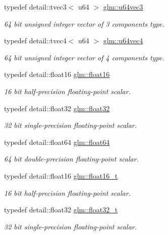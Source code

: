 \begin{DoxyCompactItemize}
typedef detail\-::tvec3$<$ u64 $>$ \hyperlink{group__gtc__type__precision_gaf3e98e85d5dd32134bf6235db89c9629}{glm\-::u64vec3}
\begin{DoxyCompactList}\small\item\em 64 bit unsigned integer vector of 3 components type. \end{DoxyCompactList}\item 
typedef detail\-::tvec4$<$ u64 $>$ \hyperlink{group__gtc__type__precision_ga550e091ec7bcd4aff560a8f5c5ff539f}{glm\-::u64vec4}
\begin{DoxyCompactList}\small\item\em 64 bit unsigned integer vector of 4 components type. \end{DoxyCompactList}\item 
typedef detail\-::float16 \hyperlink{group__gtc__type__precision_ga50c577688ec4cbdb3dfafb8e8155c82f}{glm\-::float16}
\begin{DoxyCompactList}\small\item\em 16 bit half-\/precision floating-\/point scalar. \end{DoxyCompactList}\item 
typedef detail\-::float32 \hyperlink{group__gtc__type__precision_ga814f2f65354b6588b067cc5c67a6b340}{glm\-::float32}
\begin{DoxyCompactList}\small\item\em 32 bit single-\/precision floating-\/point scalar. \end{DoxyCompactList}\item 
typedef detail\-::float64 \hyperlink{group__gtc__type__precision_gab721f828b41f46b20cf4883b50733d3b}{glm\-::float64}
\begin{DoxyCompactList}\small\item\em 64 bit double-\/precision floating-\/point scalar. \end{DoxyCompactList}\item 
typedef detail\-::float16 \hyperlink{group__gtc__type__precision_ga7dd9d64b24117690e47631d07f08a207}{glm\-::float16\-\_\-t}
\begin{DoxyCompactList}\small\item\em 16 bit half-\/precision floating-\/point scalar. \end{DoxyCompactList}\item 
typedef detail\-::float32 \hyperlink{group__gtc__type__precision_ga642737ae3e7c434b366f2191e6944bf2}{glm\-::float32\-\_\-t}
\begin{DoxyCompactList}\small\item\em 32 bit single-\/precision floating-\/point scalar. \end{DoxyCompactList}\item 

\end{DoxyCompactItemize}
